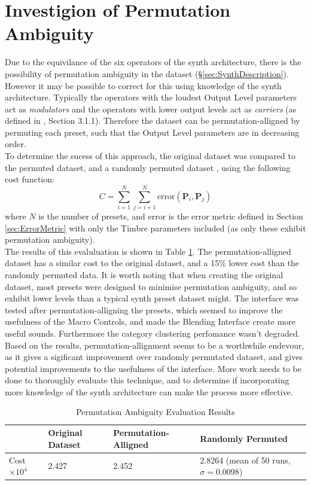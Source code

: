 \documentclass[11pt, oneside]{report}   	%
\renewcommand{\vec}[1]{\mathbf{#1}}
\begin{document}
\section{Investigion of Permutation Ambiguity}\label{sec:PermutationAmbiguity}
Due to the equivilance of the six operators of the synth architecture, there is the possibility of permutation ambiguity in the dataset (\S \ref{sec:SynthDescription}). However it may be possible to correct for this using knowledge of the synth architecture. Typically the operators with the loudest Output Level parameters act as \emph{modulators} and the operators with lower output levels act as \emph{carriers} (as defined in \cite{YeeKing}, Section 3.1.1). Therefore the dataset can be permutation-alligned by permuting each preset, such that the Output Level parameters are in decreasing order.\\
To determine the sucess of this approach, the original dataset was compared to the permuted dataset, and a randomly permuted dataset , using the following cost function:
\begin{equation}
	C = \sum_{i = 1}^{N}\sum_{j = i+1}^{N}\mathrm{error}(\vec{P}_i, \vec{P}_j)
\end{equation}
where $N$ is the number of presets, and $\mathrm{error}$ is the error metric defined in Section \ref{sec:ErrorMetric} with only the Timbre parameters included (as only these exhibit permutation ambiguity).\\
The results of this evaluluation is shown in Table \ref{tab:PermutationAmbiguity}. The permutation-alligned dataset has a similar cost to the original dataset, and a 15\% lower cost than the randomly permuted data. It is worth noting that when creating the original dataset, most presets were designed to minimise permutation ambiguity, and so exhibit lower levels than a typical synth preset dataset might.  The interface was tested after permutation-alligning the presets, which seemed to improve the usefulness of the Macro Controls, and made the Blending Interface create more useful sounds. Furthermore the category clustering perfomance wasn't degraded. Based on the results, permutation-allignment seems to be a worthwhile endevour, as it gives a sigificant improvement over randomly permutated dataset, and gives potential improvements to the usefulness of the interface. More work needs to be done to thoroughly evaluate this technique, and to determine if incorporating more knowledge of the synth architecture can make the process more effective.
\begin{table}[h]
	\vspace{-20pt}
	\centering
	\begin{tabular}{l|l|l|l}
		& Original Dataset & Permutation-Alligned & Randomly Permuted \\ \hline
		Cost $\times 10^4$ & 2.427            & 2.452                 & 2.8264  (mean of 50 runs, $\sigma = 0.0098$)
	\end{tabular}
\caption{Permutation Ambiguity Evaluation Results}
\label{tab:PermutationAmbiguity}
\vspace{-20pt}
\end{table}
\end{document}
